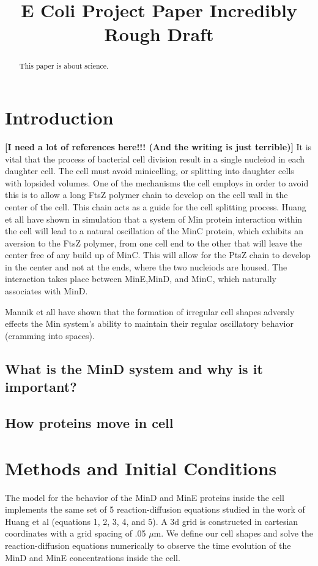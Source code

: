 \documentclass[letterpaper,twocolumn,amsmath,amssymb,pre]{revtex4-1}
\newcommand{\red}[1]{{\bf \color{red} #1}}
\newcommand{\fixme}[1]{\red{[#1]}}
\begin{document}
\title{E Coli Project Paper Incredibly Rough Draft}

\begin{abstract}
  This paper is about science.
\end{abstract}
\section{Introduction}
\fixme{I need a lot of references here!!!  (And the writing is just terrible)}
It is vital that the process of bacterial cell division result in a single
nucleiod in each daughter cell.  The cell must avoid minicelling, or
splitting into daughter cells with lopsided volumes.  One of the mechanisms
the cell employs in order to avoid this is to allow a long FtsZ polymer
chain to develop on the cell wall in the center of the cell.  This chain
acts as a guide for the cell splitting process.  Huang et all have shown in
simulation that a system of Min protein interaction within the cell will
lead to a natural oscillation of the MinC protein, which exhibits an
aversion to the FtsZ polymer, from one cell end to the other that will
leave the center free of any build up of MinC.  This will allow for the
PtsZ chain to develop in the center and not at the ends, where the two
nucleiods are housed.  The interaction takes place between MinE,MinD, and
MinC, which naturally associates with MinD.

Mannik et all have shown that the formation of irregular cell shapes
adversly effects the Min system's ability to maintain their regular
oscillatory behavior (cramming into spaces).

\subsection{What is the MinD system and why is it important?}
\subsection{How proteins move in cell}
\section{Methods and Initial Conditions}
The model for the behavior of the MinD and MinE proteins inside the
cell implements the same set of 5 reaction-diffusion equations studied in
the work of Huang et al (equations 1, 2, 3, 4, and
5)\cite{huang2003dynamic}. A 3d grid is constructed in cartesian
coordinates with a grid spacing of .05 $\mu$m. We define our cell
shapes and solve the reaction-diffusion equations numerically to
observe the time evolution of the MinD and MinE concentrations inside
the cell.
\end{document}
